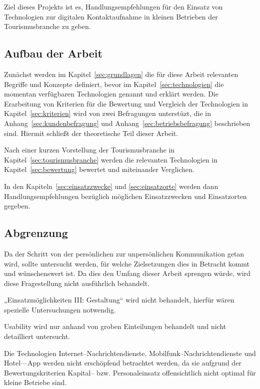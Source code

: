 Ziel dieses Projekts ist es, Handlungsempfehlungen für den Einsatz von Technologien zur digitalen Kontaktaufnahme in kleinen Betrieben der Tourismusbranche zu geben.

\subsection{Aufbau der Arbeit}


Zunächst werden im Kapitel~\ref{sec:grundlagen} die für diese Arbeit relevanten Begriffe und Konzepte definiert, bevor im Kapitel~\ref{sec:technologien} die momentan verfügbaren Technologien genannt und erklärt werden. Die Erarbeitung von Kriterien für die Bewertung und Vergleich der Technologien in Kapitel~\ref{sec:kriterien} wird von zwei Befragungen unterstüzt, die in Anhang~\ref{sec:kundenbefragung} und Anhang~\ref{sec:betriebsbefragung} beschrieben sind. Hiermit schließt der theoretische Teil dieser Arbeit. 

Nach einer kurzen Vorstellung der Tourismusbranche in Kapitel~\ref{sec:tourismusbranche} werden die relevanten Technologien in Kapitel~\ref{sec:bewertung} bewertet und miteinander Verglichen.

In den Kapiteln~\ref{sec:einsatzzwecke} und \ref{sec:einsatzorte} werden dann Handlungsempfehlungen bezüglich möglichen Einsatzzwecken und Einsatzorten gegeben.

\subsection{Abgrenzung}


Da der Schritt von der persönlichen  zur unpersönlichen Kommunikation getan wird, sollte untersucht werden, für welche Zielsetzungen dies in Betracht kommt und wünschenswert ist. Da dies den Umfang dieser Arbeit sprengen würde, wird diese Fragestellung nicht ausführlich behandelt.

„Einsatzmöglichkeiten III: Gestaltung“ wird nicht behandelt, hierfür wären spezielle Untersuchungen notwendig.

Usability wird nur anhand von groben Einteilungen behandelt und nicht detailliert untersucht.

Die Technologien Internet--Nachrichtendienste, Mobilfunk--Nachrichtendienste und Hotel––App werden nicht erschöpfend betrachtet werden, da sie aufgrund der Bewertungskriterien Kapital-- bzw. Personaleinsatz offensichtlich nicht optimal für kleine Betriebe sind.
